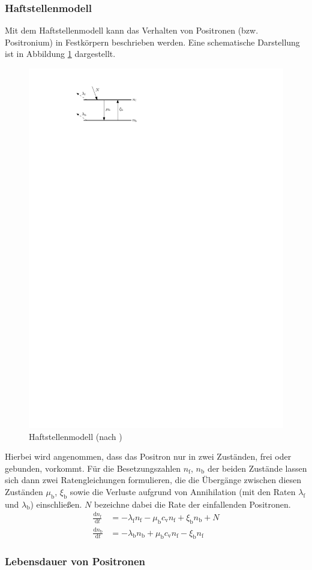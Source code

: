 \documentclass[11pt, a4paper]{article}
\numberwithin{equation}{section}
\begin{document}
\subsubsection{Haftstellenmodell}

Mit dem Haftstellenmodell kann das Verhalten von Positronen (bzw. Positronium) in Festkörpern beschrieben werden.
Eine schematische Darstellung ist in Abbildung \ref{fig:trapping_model} dargestellt.
\begin{figure}[htbp]
	\centering
	\includegraphics[width=.5\textwidth]{./figures/trapping_model}
	\caption{Haftstellenmodell (nach \cite{schatz})}
	\label{fig:trapping_model}
\end{figure}
Hierbei wird angenommen, dass das Positron nur in zwei Zuständen, frei oder gebunden, vorkommt.
Für die Besetzungszahlen $n_\mathrm{f}$, $n_\mathrm{b}$ der beiden Zustände lassen sich dann zwei Ratengleichungen formulieren, die die Übergänge zwischen diesen Zuständen $\mu_\mathrm{b}$, $\xi_\mathrm{b}$ sowie die Verluste aufgrund von Annihilation (mit den Raten $\lambda_\mathrm{f}$ und $\lambda_\mathrm{b}$) einschließen.
$N$ bezeichne dabei die Rate der einfallenden Positronen.
\begin{align}
	\frac{\mathrm{d}n_\mathrm{f}}{\mathrm{d}t}&=-\lambda_\mathrm{f}n_\mathrm{f}-\mu_\mathrm{b}c_\mathrm{v}n_\mathrm{f} + \xi_\mathrm{b}n_\mathrm{b} + N \\
	\frac{\mathrm{d}n_\mathrm{b}}{\mathrm{d}t}&=-\lambda_\mathrm{b}n_\mathrm{b}+\mu_\mathrm{b}c_\mathrm{v}n_\mathrm{f} - \xi_\mathrm{b}n_\mathrm{f}
\end{align}

\subsubsection{Lebensdauer von Positronen}
\end{document}
